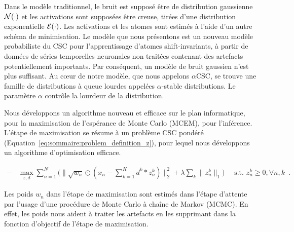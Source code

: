 Dans le modèle traditionnel, le bruit est supposé être de distribution gaussienne $\cal N(\cdot)$ et les activations sont supposées être creuse, tirées d'une distribution exponentielle $\cal E(\cdot)$. Les activations et les atomes sont estimés à l'aide d'un autre schéma de minimisation. Le modèle que nous présentons est un nouveau modèle probabiliste du CSC pour l'apprentissage d'atomes shift-invariants, à partir de données de séries temporelles neuronales non traitées contenant des artefacts potentiellement importants. Par conséquent, un modèle de bruit gaussien n'est plus suffisant. Au cœur de notre modèle, que nous appelons $\alpha$CSC, se trouve une famille de distributions à queue lourdes appelées $\alpha$-stable distributions. Le paramètre $\alpha$ contrôle la lourdeur de la distribution.

Nous développons un algorithme nouveau et efficace sur le plan informatique, pour la maximisation de l'espérance de Monte Carlo (MCEM), pour l'inférence. L'étape de maximisation se résume à un problème CSC pondéré (Equation~\ref{eq:sommaire:problem_definition_z}), pour lequel nous développons un algorithme d'optimisation efficace.

\begin{align}
- & \max_{z, d} \sum_{n=1}^{N} \Big( \|\sqrt{w_{n}} \odot (x_{n} - \sum_{k=1}^{K}d^{k} * z_{n}^{k})\|_{2}^{2} + \lambda \sum_{k}{ \|{z}_{n}^{k} \|_1}\Big) \quad \text{ s.t.  } {z}_n^k \geq 0, \forall n,k\enspace .
\label{eq:sommaire:problem_definition_z}
\end{align} 

Les poids $w_n$ dans l'étape de maximisation sont estimés dans l'étape d'attente par l’usage d'une procédure de Monte Carlo à chaîne de Markov (MCMC). En effet, les poids nous aident à traiter les artefacts en les supprimant dans la fonction d'objectif de l'étape de maximisation.

